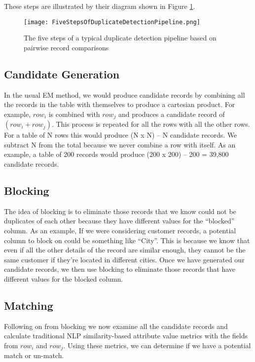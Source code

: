 \documentclass{article}
\begin{document}
These steps are illustrated by their diagram shown in Figure \ref{fig:trad-em-label}.

\begin{figure}[h]
\texttt{[image: FiveStepsOfDuplicateDetectionPipeline.png]}
\caption{The five steps of a typical duplicate detection pipeline based on pairwise record comparisons}
\label{fig:trad-em-label}
\end{figure} %


\subsection{Candidate Generation}
In the usual EM method, we would produce candidate records by combining all the records in the table with themselves to produce a cartesian product. For example, \(row _{i}\) is combined with \(row _{j}\) and produces a candidate record of \((row _{i} + row _{j})\). This process is repeated for all the rows with all the other rows. For a table of N rows this would produce (N x N) – N candidate records. We subtract N from the total because we never combine a row with itself. As an example, a table of 200 records would produce (200 x 200) – 200 = 39,800 candidate records.

\subsection{Blocking}
The idea of blocking is to eliminate those records that we know could not be duplicates of each other because they have different values for the “blocked” column. As an example, If we were considering customer records, a potential column to block on could be something like “City”. This is because we know that even if all the other details of the record are similar enough, they cannot be the same customer if they’re located in different cities. Once we have generated our candidate records, we then use blocking to eliminate those records that have different values for the blocked column.

\subsection{Matching}
Following on from blocking we now examine all the candidate records and calculate traditional NLP similarity-based attribute value metrics with the fields from \(row _{i}\) and \(row _{j}\). Using these metrics, we can determine if we have a potential match or un-match.
\end{document}
